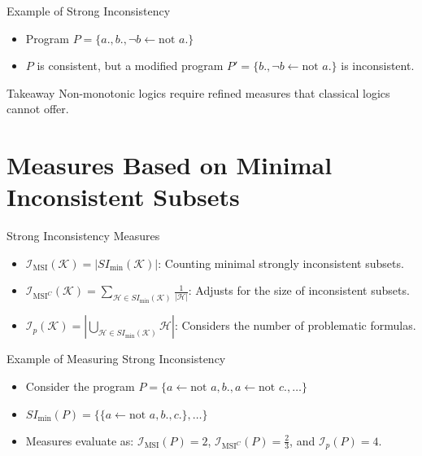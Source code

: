 \begin{frame}{Example of Strong Inconsistency}
    \begin{itemize}
        \item Program \(P = \{a., b., \neg b \leftarrow \text{not }a.\}\)
        \item \(P\) is consistent, but a modified program \(P' = \{b., \neg b \leftarrow \text{not }a.\}\) is inconsistent.
    \end{itemize}

    \begin{alertblock}{Takeaway}
        Non-monotonic logics require refined measures that classical logics cannot offer.
    \end{alertblock}
\end{frame}

\section{Measures Based on Minimal Inconsistent Subsets}

\begin{frame}{Strong Inconsistency Measures}
    \begin{itemize}
        \item \(\mathcal{I}_{\text{MSI}}(\mathcal{K}) = |SI_{\min}(\mathcal{K})|\): Counting minimal strongly inconsistent subsets.
        \item \(\mathcal{I}_{\text{MSI}^C}(\mathcal{K}) = \sum_{\mathcal{H} \in SI_{\min}(\mathcal{K})} \frac{1}{|\mathcal{H}|}\): Adjusts for the size of inconsistent subsets.
        \item \(\mathcal{I}_p(\mathcal{K}) = |\bigcup_{\mathcal{H} \in SI_{\min}(\mathcal{K})} \mathcal{H}|\): Considers the number of problematic formulas.
    \end{itemize}
\end{frame}

\begin{frame}{Example of Measuring Strong Inconsistency}
    \begin{itemize}
        \item Consider the program \(P = \{a \leftarrow \text{not }a, b., a \leftarrow \text{not }c., \dots\}\)
        \item \(SI_{\min}(P) = \{\{a \leftarrow \text{not }a, b., c.\}, \dots\}\)
        \item Measures evaluate as: \(\mathcal{I}_{\text{MSI}}(P) = 2\), \(\mathcal{I}_{\text{MSI}^C}(P) = \frac{2}{3}\), and \(\mathcal{I}_p(P) = 4\).
    \end{itemize}
\end{frame}

